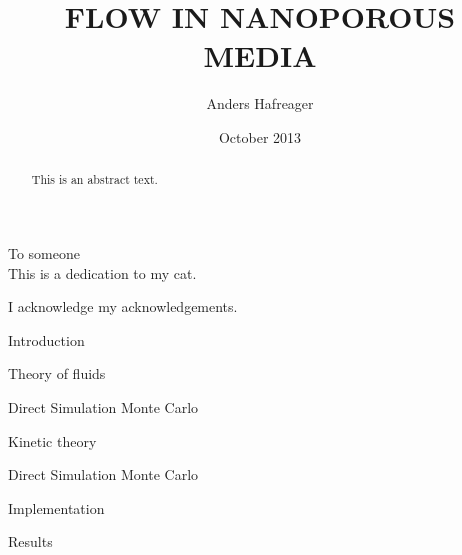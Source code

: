 \documentclass[twoside,english, a4paper, 12pt]{uiofysmaster}
\author{Anders Hafreager}
\title{\uppercase{Flow in nanoporous media}}
\date{October 2013}
\begin{document}
\maketitle
\clearpage

\begin{abstract}
This is an abstract text.
\end{abstract}
\begin{dedication}
  To someone
  \\\vspace{12pt}
  This is a dedication to my cat.
\end{dedication}
\begin{acknowledgements}
  I acknowledge my acknowledgements.
\end{acknowledgements}

\tableofcontents
\clearpage
\listoffigures
\clearpage
\listoftables

\begin{chapter}{Introduction}
  
\end{chapter}

\begin{chapter}{Theory of fluids}
  
  
  
\end{chapter}

\begin{part}{Direct Simulation Monte Carlo}
\begin{chapter}{Kinetic theory}
  \label{chap:kinetic_theory}
  
  
\end{chapter}

\begin{chapter}{Direct Simulation Monte Carlo}
  \label{chap:dsmc}
  
  
  
  
  
  
  
\end{chapter}
\begin{chapter}{Implementation}
  
  
  
  
\end{chapter}
\begin{chapter}{Results}
  \label{chap:dsmc_results}
  
  
\end{chapter}
\end{part}
\end{document}
